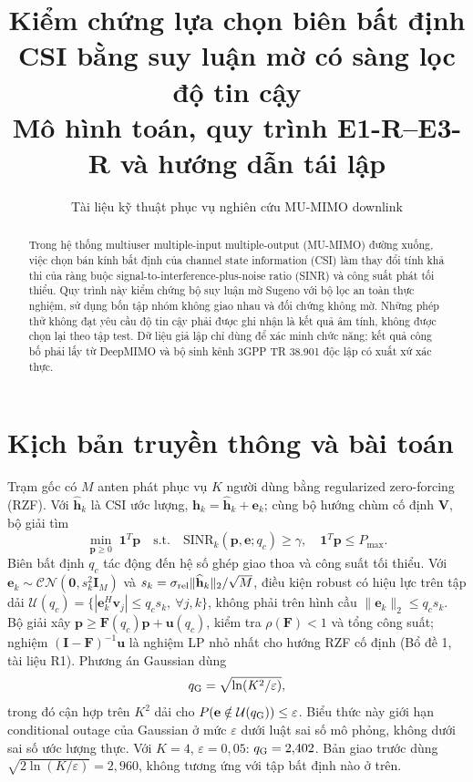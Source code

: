 \documentclass[conference,onecolumn,10pt]{IEEEtran}
\title{Kiểm chứng lựa chọn biên bất định CSI bằng suy luận mờ có sàng lọc độ tin cậy\\\large Mô hình toán, quy trình E1-R--E3-R và hướng dẫn tái lập}
\author{Tài liệu kỹ thuật phục vụ nghiên cứu MU-MIMO downlink}
\begin{document}
\maketitle
\begin{abstract}
Trong hệ thống multiuser multiple-input multiple-output (MU-MIMO) đường xuống, việc chọn bán kính bất định của channel state information (CSI) làm thay đổi tính khả thi của ràng buộc signal-to-interference-plus-noise ratio (SINR) và công suất phát tối thiểu. Quy trình này kiểm chứng bộ suy luận mờ Sugeno với bộ lọc an toàn thực nghiệm, sử dụng bốn tập nhóm không giao nhau và đối chứng không mờ. Những phép thử không đạt yêu cầu độ tin cậy phải được ghi nhận là kết quả âm tính, không được chọn lại theo tập test. Dữ liệu giả lập chỉ dùng để xác minh chức năng; kết quả công bố phải lấy từ DeepMIMO và bộ sinh kênh 3GPP TR 38.901 độc lập có xuất xứ xác thực.
\end{abstract}
\section{Kịch bản truyền thông và bài toán}
Trạm gốc có $M$ anten phát phục vụ $K$ người dùng bằng regularized zero-forcing (RZF). Với $\widehat{\mathbf h}_k$ là CSI ước lượng, $\mathbf h_k=\widehat{\mathbf h}_k+\mathbf e_k$; cùng bộ hướng chùm cố định $\mathbf V$, bộ giải tìm
\begin{equation}
\min_{\mathbf p\geq0}\;\mathbf1^T\mathbf p\quad \text{s.t.}\quad \mathrm{SINR}_k(\mathbf p,\mathbf e;q_c)\geq\gamma,\quad \mathbf1^T\mathbf p\leq P_{\max}.
\end{equation}
Biên bất định $q_c$ tác động đến hệ số ghép giao thoa và công suất tối thiểu. Với $\mathbf e_k\sim\mathcal{CN}(\mathbf 0,s_k^2\mathbf I_M)$ và $s_k=\sigma_{\rm rel}\|\widehat{\mathbf h}_k\|_2/\sqrt M$, điều kiện robust có hiệu lực trên tập dải $\mathcal U(q_c)=\{|\mathbf e_k^H\mathbf v_j|\leq q_cs_k,\ \forall j,k\}$, không phải trên hình cầu $\|\mathbf e_k\|_2\leq q_cs_k$. Bộ giải xây $\mathbf p\geq\mathbf F(q_c)\mathbf p+\mathbf u(q_c)$, kiểm tra $\rho(\mathbf F)<1$ và tổng công suất; nghiệm $(\mathbf I-\mathbf F)^{-1}\mathbf u$ là nghiệm LP nhỏ nhất cho hướng RZF cố định (Bổ đề 1, tài liệu R1). Phương án Gaussian dùng
\begin{equation}
q_{\rm G}=\sqrt{\ln(K^2/\varepsilon)},
\end{equation}
trong đó cận hợp trên $K^2$ dải cho $P(\mathbf e\notin\mathcal U(q_{\rm G}))\leq\varepsilon$. Biểu thức này giới hạn conditional outage của Gaussian ở mức $\varepsilon$ dưới luật sai số mô phỏng, không dưới sai số ước lượng thực. Với $K=4$, $\varepsilon=0{,}05$: $q_{\rm G}=2{,}402$. Bản giao trước dùng $\sqrt{2\ln(K/\varepsilon)}=2{,}960$, không tương ứng với tập bất định nào ở trên.
\end{document}
